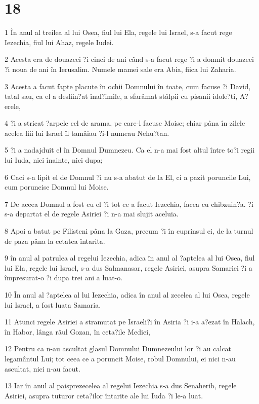 \chapter{18}

\par 1 În anul al treilea al lui Osea, fiul lui Ela, regele lui Israel, s-a facut rege Iezechia, fiul lui Ahaz, regele Iudei.
\par 2 Acesta era de douazeci ?i cinci de ani când s-a facut rege ?i a domnit douazeci ?i noua de ani în Ierusalim. Numele mamei sale era Abia, fiica lui Zaharia.
\par 3 Acesta a facut fapte placute în ochii Domnului în toate, cum facuse ?i David, tatal sau, ca el a desfiin?at înal?imile, a sfarâmat stâlpii cu pisanii idole?ti, A?erele,
\par 4 ?i a stricat ?arpele cel de arama, pe care-l facuse Moise; chiar pâna în zilele acelea fiii lui Israel îl tamâiau ?i-l numeau Nehu?tan.
\par 5 ?i a nadajduit el în Domnul Dumnezeu. Ca el n-a mai fost altul între to?i regii lui Iuda, nici înainte, nici dupa;
\par 6 Caci s-a lipit el de Domnul ?i nu s-a abatut de la El, ci a pazit poruncile Lui, cum poruncise Domnul lui Moise.
\par 7 De aceea Domnul a fost cu el ?i tot ce a facut Iezechia, facea cu chibzuin?a. ?i s-a departat el de regele Asiriei ?i n-a mai slujit aceluia.
\par 8 Apoi a batut pe Filisteni pâna la Gaza, precum ?i în cuprinsul ei, de la turnul de paza pâna la cetatea întarita.
\par 9 în anul al patrulea al regelui Iezechia, adica în anul al ?aptelea al lui Osea, fiul lui Ela, regele lui Israel, s-a dus Salmanasar, regele Asiriei, asupra Samariei ?i a împresurat-o ?i dupa trei ani a luat-o.
\par 10 În anul al ?aptelea al lui Iezechia, adica în anul al zecelea al lui Osea, regele lui Israel, a fost luata Samaria.
\par 11 Atunci regele Asiriei a stramutat pe Israeli?i în Asiria ?i i-a a?ezat în Halach, în Habor, lânga râul Gozan, în ceta?ile Mediei,
\par 12 Pentru ca n-au ascultat glasul Domnului Dumnezeului lor ?i au calcat legamântul Lui; tot ceea ce a poruncit Moise, robul Domnului, ei nici n-au ascultat, nici n-au facut.
\par 13 Iar în anul al paisprezecelea al regelui Iezechia s-a dus Senaherib, regele Asiriei, asupra tuturor ceta?ilor întarite ale lui Iuda ?i le-a luat.

